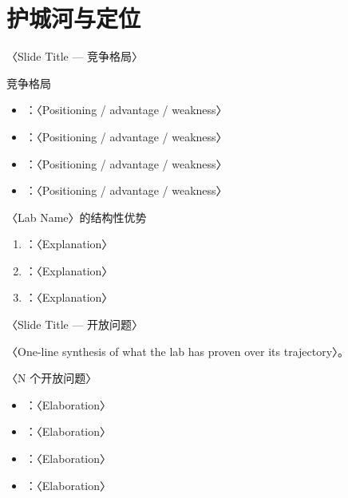 \renewcommand{\secblurb}{〈本节一句话主旨：为什么该团队的领先地位是可持续的〉}
\section{护城河与定位}

\begin{frame}{〈Slide Title — 竞争格局〉}
  \begin{block}{竞争格局}
    \begin{itemize}
      \item {}：〈Positioning / advantage / weakness〉
      \item {}：〈Positioning / advantage / weakness〉
      \item {}：〈Positioning / advantage / weakness〉
      \item {}：〈Positioning / advantage / weakness〉
    \end{itemize}
  \end{block}
  \tightgap
  \begin{block}{〈Lab Name〉的结构性优势}
    \begin{enumerate}
      \item {}：〈Explanation〉
      \item {}：〈Explanation〉
      \item {}：〈Explanation〉
    \end{enumerate}
  \end{block}
\end{frame}

\begin{frame}{〈Slide Title — 开放问题〉}
  \begin{callout}
    〈One-line synthesis of what the lab has proven over its trajectory〉。
  \end{callout}
  \tightgap
  \begin{block}{〈N 个开放问题〉}
    \begin{itemize}
      \item {}：〈Elaboration〉
      \item {}：〈Elaboration〉
      \item {}：〈Elaboration〉
      \item {}：〈Elaboration〉
    \end{itemize}
  \end{block}
\end{frame}


